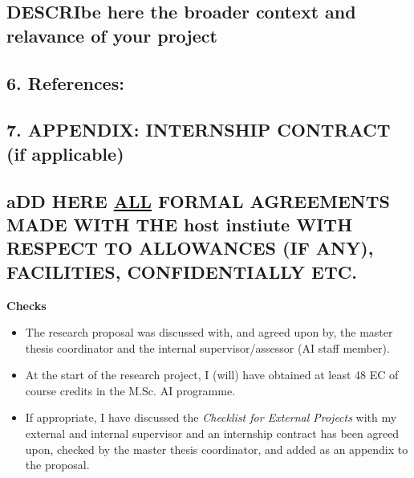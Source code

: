 \documentclass[
]{article}
\begin{document}
\hypertarget{describe-here-the-broader-context-and-relavance-of-your-project}{%
\subsection{DESCRIbe here the broader context and relavance of your
project}\label{describe-here-the-broader-context-and-relavance-of-your-project}}

\hypertarget{references}{%
\subsection{\texorpdfstring{6. References:
}{6. References: }}\label{references}}

\hypertarget{appendix-internship-contract-if-applicable}{%
\subsection{7. APPENDIX: INTERNSHIP CONTRACT (if
applicable)}\label{appendix-internship-contract-if-applicable}}

\hypertarget{add-here-all-formal-agreements-made-with-the-host-instiute-with-respect-to-allowances-if-any-facilities-confidentially-etc.}{%
\subsection{\texorpdfstring{aDD HERE \ul{ALL} FORMAL AGREEMENTS MADE
WITH THE host instiute WITH RESPECT TO ALLOWANCES (IF ANY), FACILITIES,
CONFIDENTIALLY ETC.
}{aDD HERE ALL FORMAL AGREEMENTS MADE WITH THE host instiute WITH RESPECT TO ALLOWANCES (IF ANY), FACILITIES, CONFIDENTIALLY ETC. }}\label{add-here-all-formal-agreements-made-with-the-host-instiute-with-respect-to-allowances-if-any-facilities-confidentially-etc.}}

\hfill\break

\textbf{Checks}

\begin{itemize}
\item
  The research proposal was discussed with, and agreed upon by, the
  master thesis coordinator and the internal supervisor/assessor (AI
  staff member).
\item
  At the start of the research project, I (will) have obtained at least
  48 EC of course credits in the M.Sc. AI programme.
\item
  If appropriate, I have discussed the \emph{Checklist for External
  Projects} with my external and internal supervisor and an internship
  contract has been agreed upon, checked by the master thesis
  coordinator, and added as an appendix to the proposal.
\end{itemize}
\end{document}
